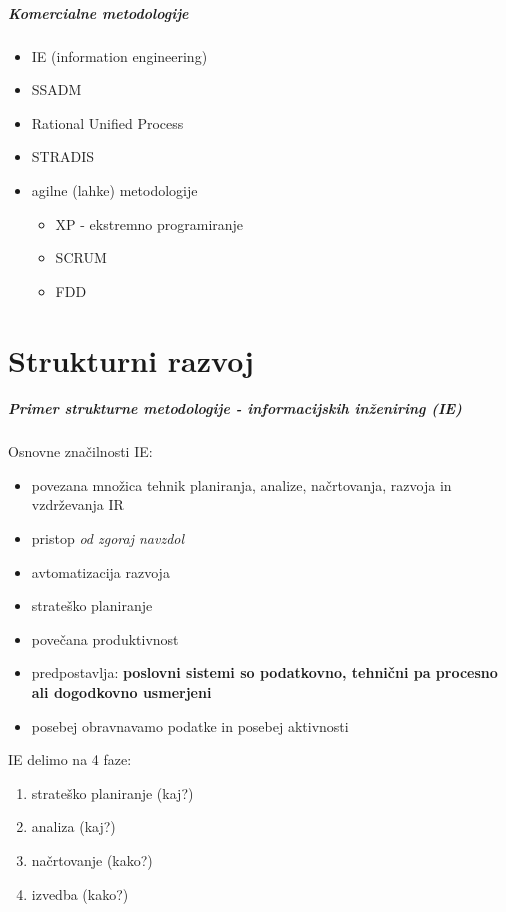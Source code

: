 \documentclass[a4paper,12pt]{report}
\begin{document}
   \paragraph{Komercialne metodologije}\mbox{}
   \begin{itemize}
      \item IE (information engineering)
      \item SSADM
      \item Rational Unified Process
      \item STRADIS
      \item agilne (lahke) metodologije
      \begin{itemize}
         \item XP - ekstremno programiranje
         \item SCRUM
         \item FDD
      \end{itemize}
   \end{itemize}

\chapter{Strukturni razvoj}

   \paragraph{Primer strukturne metodologije - informacijskih inženiring (IE)}\mbox{}
   Osnovne značilnosti IE:
   \begin{itemize}
      \item povezana množica tehnik planiranja, analize, načrtovanja, razvoja in vzdrževanja  IR
      \item pristop \textit{od zgoraj navzdol}
      \item avtomatizacija razvoja
      \item strateško planiranje
      \item povečana produktivnost
      \item predpostavlja: \textbf{poslovni sistemi so podatkovno, tehnični pa procesno ali dogodkovno usmerjeni}
      \item posebej obravnavamo podatke in posebej aktivnosti
   \end{itemize}
   IE delimo na 4 faze:
   \begin{enumerate}
      \item strateško planiranje (kaj?)
      \item analiza (kaj?)
      \item načrtovanje (kako?)
      \item izvedba (kako?)
   \end{enumerate}
\end{document}
